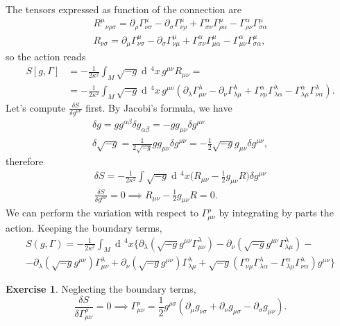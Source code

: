 \documentclass[a4paper,12pt]{book}
\newcommand{\dd}{\mathop{\mathrm{d}\!}{}}
\theoremstyle{definition}
\newtheorem{exercise}{Exercise}
\theoremstyle{remark}
\begin{document}
The tensors expressed as function of the connection are
\begin{gather*}
R^\mu{}_{\nu\rho\sigma}=\partial_\rho\Gamma^\mu_{\nu\sigma}-\partial_\sigma\Gamma^\mu_{\nu\rho}+\Gamma^\alpha_{\sigma\nu}\Gamma^\mu_{\rho\alpha}-\Gamma^\alpha_{\rho\nu}\Gamma^\mu_{\sigma\alpha}\\
R_{\nu\sigma}=\partial_\mu\Gamma^\mu_{\nu\sigma}-\partial_\sigma\Gamma^\mu_{\nu\mu}+\Gamma^\alpha_{\sigma\nu}\Gamma^\mu_{\mu\alpha}-\Gamma^\alpha_{\mu\nu}\Gamma^\mu_{\sigma\alpha},
\end{gather*}
so the action reads
\begin{align*}
S[g,\Gamma]&=-\frac1{2\kappa^2}\int_M\sqrt{-g}\dd^4x\,g^{\mu\nu}R_{\mu\nu}=\\
&=-\frac1{2\kappa^2}\int_M\sqrt{-g}\dd^4x\,g^{\mu\nu}(\partial_\lambda\Gamma^\lambda_{\mu\nu}-\partial_\nu\Gamma^\lambda_{\lambda\mu}+\Gamma^\alpha_{\nu\mu}\Gamma^\lambda_{\lambda\alpha}-\Gamma^\alpha_{\lambda\mu}\Gamma^\lambda_{\nu\alpha}).
\end{align*}
Let's compute $\frac{\delta S}{\delta g^{\mu\nu}}$ first. By Jacobi's formula, we have
\begin{gather*}
\delta g=gg^{\alpha\beta}\delta g_{\alpha\beta}=-gg_{\mu\nu}\delta g^{\mu\nu}\\
\delta\sqrt{-g}=\frac1{2\sqrt{-g}}gg_{\mu\nu}\delta g^{\mu\nu}=-\frac12\sqrt{-g}g_{\mu\nu}\delta g^{\mu\nu},
\end{gather*}
therefore
\begin{gather*}
\delta S=-\frac1{2\kappa^2}\int\sqrt{-g}\dd^4x\biggl(R_{\mu\nu}-\frac12g_{\mu\nu}R\biggr)\delta g^{\mu\nu}\\
\frac{\delta S}{\delta g^{\mu\nu}}=0\implies R_{\mu\nu}-\frac12g_{\mu\nu}R=0.
\end{gather*}
We can perform the variation with respect to $\Gamma^\rho_{\mu\nu}$ by integrating by parts the action. Keeping the boundary terms,
\begin{multline*}
S(g,\Gamma)=-\frac1{2\kappa^2}\int_M\dd^4x\bigl\{\partial_\lambda(\sqrt{-g}g^{\mu\nu}\Gamma^\lambda_{\mu\nu})-\partial_\nu(\sqrt{-g}g^{\mu\nu}\Gamma^\lambda_{\lambda\mu})-{}\\
-\partial_\lambda(\sqrt{-g}g^{\mu\nu})\Gamma^\lambda_{\mu\nu}+\partial_\nu(\sqrt{-g}g^{\mu\nu})\Gamma^\lambda_{\lambda\mu}+\sqrt{-g}(\Gamma^\alpha_{\nu\mu}\Gamma^\lambda_{\lambda\alpha}-\Gamma^\alpha_{\lambda\mu}\Gamma^\lambda_{\nu\alpha})g^{\mu\nu}\bigr\}
\end{multline*}
\begin{exercise}
\label{thm:varGamma}
Neglecting the boundary terms,
\[\frac{\delta S}{\delta\Gamma^\rho_{\mu\nu}}=0\implies\Gamma^\rho_{\mu\nu}=\frac12g^{\rho\sigma}(\partial_\mu g_{\nu\sigma}+\partial_\nu g_{\mu\sigma}-\partial_\sigma g_{\mu\nu}).\]
\end{exercise}
\end{document}
